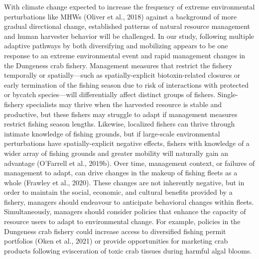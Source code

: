 \documentclass[]{elsarticle} %
\begin{document}
With climate change expected to increase the frequency of extreme
environmental perturbations like MHWs (Oliver et al., 2018) against a
background of more gradual directional change, established patterns of
natural resource management and human harvester behavior will be
challenged. In our study, following multiple adaptive pathways by both
diversifying and mobilizing appears to be one response to an extreme
environmental event and rapid management changes in the Dungeness crab
fishery. Management measures that restrict the fishery temporally or
spatially---such as spatially-explicit biotoxin-related closures or
early termination of the fishing season due to risk of interactions with
protected or bycatch species---will differentially affect distinct
groups of fishers. Single-fishery specialists may thrive when the
harvested resource is stable and productive, but these fishers may
struggle to adapt if management measures restrict fishing season
lengths. Likewise, localized fishers can thrive through intimate
knowledge of fishing grounds, but if large-scale environmental
perturbations have spatially-explicit negative effects, fishers with
knowledge of a wider array of fishing grounds and greater mobility will
naturally gain an advantage (O'Farrell et al., 2019b). Over time,
management context, or failures of management to adapt, can drive
changes in the makeup of fishing fleets as a whole (Frawley et al.,
2020). These changes are not inherently negative, but in order to
maintain the social, economic, and cultural benefits provided by a
fishery, managers should endeavour to anticipate behavioral changes
within fleets. Simultaneously, managers should consider policies that
enhance the capacity of resource users to adapt to environmental change.
For example, policies in the Dungeness crab fishery could increase
access to diversified fishing permit portfolios (Oken et al., 2021) or
provide opportunities for marketing crab products following evisceration
of toxic crab tissues during harmful algal blooms.
\end{document}
